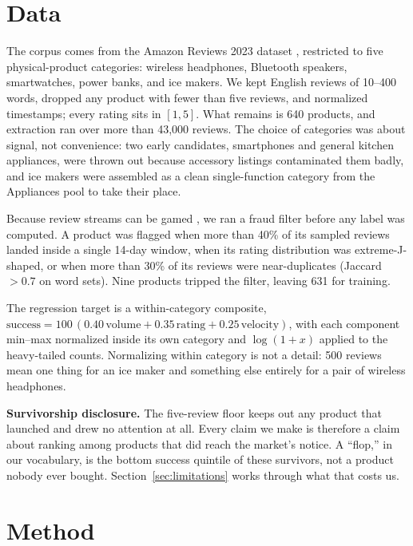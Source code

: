 \documentclass[journal]{IEEEtran}
\begin{document}
\section{Data}
\label{sec:data}
The corpus comes from the Amazon Reviews 2023 dataset \cite{hou2024amazon}, restricted to five physical-product categories: wireless headphones, Bluetooth speakers, smartwatches, power banks, and ice makers. We kept English reviews of 10--400 words, dropped any product with fewer than five reviews, and normalized timestamps; every rating sits in $[1,5]$. What remains is 640 products, and extraction ran over more than 43{,}000 reviews. The choice of categories was about signal, not convenience: two early candidates, smartphones and general kitchen appliances, were thrown out because accessory listings contaminated them badly, and ice makers were assembled as a clean single-function category from the Appliances pool to take their place.

Because review streams can be gamed \cite{jindal2008opinion,mayzlin2014promotional}, we ran a fraud filter before any label was computed. A product was flagged when more than 40\% of its sampled reviews landed inside a single 14-day window, when its rating distribution was extreme-J-shaped, or when more than 30\% of its reviews were near-duplicates (Jaccard $> 0.7$ on word sets). Nine products tripped the filter, leaving 631 for training.

The regression target is a within-category composite, $\text{success} = 100\,(0.40\,\text{volume} + 0.35\,\text{rating} + 0.25\,\text{velocity})$, with each component min--max normalized inside its own category and $\log(1+x)$ applied to the heavy-tailed counts. Normalizing within category is not a detail: 500 reviews mean one thing for an ice maker and something else entirely for a pair of wireless headphones.

\textbf{Survivorship disclosure.} The five-review floor keeps out any product that launched and drew no attention at all. Every claim we make is therefore a claim about ranking among products that did reach the market's notice. A ``flop,'' in our vocabulary, is the bottom success quintile of these survivors, not a product nobody ever bought. Section~\ref{sec:limitations} works through what that costs us.

\section{Method}
\label{sec:method}
\end{document}
